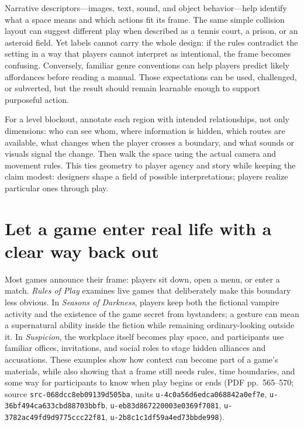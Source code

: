 Narrative descriptors---images, text, sound, and object behavior---help identify what a space means and which actions fit its frame. The same simple collision layout can suggest different play when described as a tennis court, a prison, or an asteroid field. Yet labels cannot carry the whole design: if the rules contradict the setting in a way that players cannot interpret as intentional, the frame becomes confusing. Conversely, familiar genre conventions can help players predict likely affordances before reading a manual. Those expectations can be used, challenged, or subverted, but the result should remain learnable enough to support purposeful action.

For a level blockout, annotate each region with intended relationships, not only dimensions: who can see whom, where information is hidden, which routes are available, what changes when the player crosses a boundary, and what sounds or visuals signal the change. Then walk the space using the actual camera and movement rules. This ties geometry to player agency and story while keeping the claim modest: designers shape a field of possible interpretations; players realize particular ones through play.

\section{Let a game enter real life with a clear way back out}\label{06-engine-ii-ch047-let-a-game-enter-real-life-with-a-clear-way-back-out}

Most games announce their frame: players sit down, open a menu, or enter a match. \emph{Rules of Play} examines live games that deliberately make this boundary less obvious. In \emph{Seasons of Darkness}, players keep both the fictional vampire activity and the existence of the game secret from bystanders; a gesture can mean a supernatural ability inside the fiction while remaining ordinary-looking outside it. In \emph{Suspicion}, the workplace itself becomes play space, and participants use familiar offices, invitations, and social roles to stage hidden alliances and accusations. These examples show how context can become part of a game's materials, while also showing that a frame still needs rules, time boundaries, and some way for participants to know when play begins or ends (PDF pp.~565--570; source \texttt{src-068dcc8eb09139d505ba}, units \texttt{u-4c0a56d6edca068842a0ef7e}, \texttt{u-36bf494ca633cbd88703bbfb}, \texttt{u-eb83d867220003e0369f7081}, \texttt{u-3782ac49fd9d9775ccc22f81}, \texttt{u-2b8c1c1df59a4ed73bbde998}).

